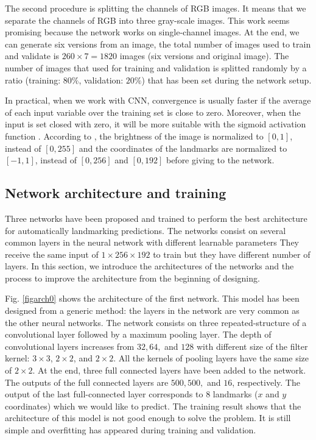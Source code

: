 \documentclass[conference]{IEEEtran}
\begin{document}
The second procedure is splitting the channels of RGB images. It means that we separate the channels of RGB into three gray-scale images. This work seems promising because the network works on single-channel images. At the end, we can generate six versions from an image, the total number of images used to train and validate is $260 \times 7 = 1820$ images (six versions and original image). The number of images that used for training and validation is splitted randomly by a ratio (training: $80\%$, validation: $20\%$) that has been set during the network setup.

In practical, when we work with CNN, convergence is usually faster if the average of each input variable over the training set is close to zero. Moreover, when the input is set closed with zero, it will be more suitable with the sigmoid activation function \cite{lecun2012efficient}. According to \cite{lecun2012efficient}, the brightness of the image is normalized to $[0,1]$, instead of $[0,255]$ and the coordinates of the landmarks are normalized to $[-1,1]$, instead of $[0,256]$ and $[0,192]$ before giving to the network.
\subsection{Network architecture and training}
Three networks have been proposed and trained to perform the best architecture for automatically landmarking predictions. The networks consist on several common layers in the neural network with different learnable parameters They receive the same input of $1 \times 256 \times 192$ to train but they have different number of layers. In this section, we introduce the architectures of the networks and the process to improve the architecture from the beginning of designing.

Fig. \ref{figarch0} shows the architecture of the first network. This model has been designed from a generic method: the layers in the network are very common as the other neural networks. The network consists on three repeated-structure of a convolutional layer followed by a maximum pooling layer. The depth of convolutional layers increases from $32, 64,$ and $128$ with different size of the filter kernel: $3 \times 3$, $2 \times 2$, and $2 \times 2$. All the kernels of pooling layers have the same size of $2 \times 2$.  At the end, three full connected layers have been added to the network. The outputs of the full connected layers are $500, 500,$ and $16$, respectively. The output of the last full-connected layer corresponds to 8 landmarks ($x$ and $y$ coordinates) which we would like to predict. The training result shows that the architecture of this model is not good enough to solve the problem. It is still simple and overfitting has appeared during training and validation. 
\end{document}
